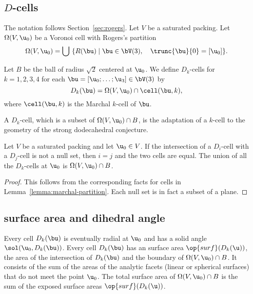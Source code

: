 \subsection{$D$-cells}



The notation follows Section~\ref{sec:rogers}.  Let $V$ be a saturated
packing. 
Let $\Omega( V,\u_0)$ be a Voronoi cell with  Rogers's partition 
\[
\Omega(V, \u_0) = \bigcup \ \{ R( \bu) \mid { \bu\in  \bV(3),\quad \trunc{\bu}{0}= [\u_0] }\}.
\]
%
%

\begin{definition}[$B$,~$D_k$-cell]
  Let $B$ be the ball of radius $\sqrt2$ centered at
  $\u_0$.  We define $D_k$-cells for $k=1,2,3,4$ for each $
  \bu=[\u_0;\ldots;\u_3]\in \bV(3)$ by
\[
D_k(\bu) = \Omega(V,\u_0)\cap \cell(\bu,k),
\]
where $\cell(\bu,k)$ is the  Marchal $k$-cell of $\bu$.
\end{definition}
%
%
%


A $D_k$-cell, which is a subset of
$\Omega(V,\u_0)\cap B$, is the adaptation of a $k$-cell to the
geometry of the strong dodecahedral conjecture.  

\begin{lemma}[]
  Let $V$ be a saturated packing and let $\u_0\in V$.  If the intersection
of a $D_i$-cell with a $D_j$-cell is not a null set, then $i=j$ and the two
cells are equal.   The union
  of all the $D_k$-cells at $\u_0$ is $\Omega(V, \u_0)\cap B$.
\end{lemma}
%

\begin{proof} This follows from the corresponding facts for cells in
  Lemma~\ref{lemma:marchal-partition}.  Each null set is in fact a subset
  of a plane.
\end{proof}


\subsection{surface area and dihedral angle}

Every cell $D_k(\bu)$ is eventually radial at $ \u_0$ and has a
solid angle $\sol(\u_0,D_k(\bu))$.  Every cell $D_k(\bu)$ has
an  surface area $\op{surf}(D_k(\u))$, the area of
the intersection of $D_k(\bu)$ and the boundary of $\Omega(V,
\u_0)\cap B$.  It consists of the sum of the areas of the analytic
facets (linear or spherical surfaces) that do not meet the point $
\u_0$.  The total surface area of $\Omega(V,\u_0) \cap B$ is the sum of the
exposed surface areas $\op{surf}(D_k(\u))$.  %

